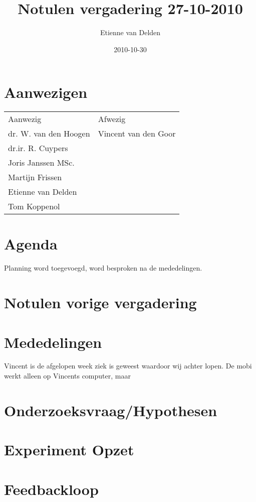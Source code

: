 \documentclass[a4paper]{article}
\title{Notulen vergadering 27-10-2010}
\author{Etienne van Delden}
\date{2010-10-30}
\begin{document}
\ifpdf
{}
\else
{}
\fi

\maketitle

\section{Aanwezigen} %
\label{sec:aanwezigen}
\begin{tabular}{l|l}
Aanwezig & Afwezig \\
dr. W. van den Hoogen & Vincent van den Goor \\
dr.ir. R. Cuypers & \\
Joris Janssen MSc. & \\
Martijn Frissen & \\
Etienne van Delden & \\
Tom Koppenol & 
\end{tabular}

\section{Agenda} %
\label{sec:agenda}
    Planning word toegevoegd, word besproken na de mededelingen.

\section{Notulen vorige vergadering} %
\label{sec:notulen_vorige_vergadering}


\section{Mededelingen} %
\label{sec:mededelingen}
    Vincent is de afgelopen week ziek is geweest waardoor wij achter lopen. De mobi werkt alleen op Vincents computer, maar 

\section{Onderzoeksvraag/Hypothesen} %
\label{sec:onderzoeksvraag_hypothesen}


\section{Experiment Opzet} %
\label{sec:experiment_opzet}


\section{Feedbackloop} %
\label{sec:feedbackloop}

\end{document}
